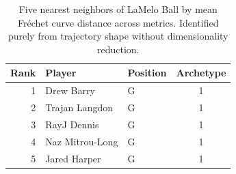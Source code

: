 \begin{table}[htbp]
  \centering\small
  \begin{tabular}{rllc}
    \toprule
    Rank & Player & Position & Archetype \\
    \midrule
    1 & Drew Barry & G & 1 \\
    2 & Trajan Langdon & G & 1 \\
    3 & RayJ Dennis & G & 1 \\
    4 & Naz Mitrou-Long & G & 1 \\
    5 & Jared Harper & G & 1 \\
    \bottomrule
  \end{tabular}
  \caption{Five nearest neighbors of LaMelo Ball by mean Fr\'{e}chet curve distance across metrics. Identified purely from trajectory shape without dimensionality reduction.}
  \label{tab:LaMelo_Ball_frechet_curve_neighbors}
\end{table}

